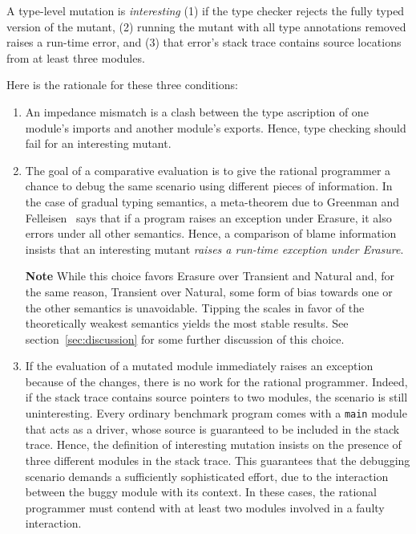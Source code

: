 
A type-level mutation is {\em interesting\/} (1) if the type checker rejects the fully typed version of the mutant,
(2) running the mutant with all type annotations removed raises a run-time error, and
(3) that error's stack trace contains source locations from at least three modules.

Here is the rationale for these three conditions:
\begin{enumerate}

\item An impedance mismatch is a clash between the type ascription of one
module's imports and another module's exports. Hence, type checking should fail
for an interesting mutant.

\item The goal of a comparative evaluation is to give the rational programmer a
chance to debug the same scenario using different pieces of information.  In the
case of gradual typing semantics, a meta-theorem due to Greenman and
Felleisen~\cite{gf-icfp-2018} says that if a program raises an exception under
Erasure, it also errors under all other semantics.  Hence, a comparison of blame
information insists that an interesting mutant {\em raises a run-time exception
under Erasure\/}.

{\bf Note} While this choice favors Erasure over Transient and Natural and, for
the same reason, Transient over Natural, some form of bias towards one or the
other semantics is unavoidable. Tipping the scales in favor of the theoretically
weakest semantics yields the most stable results. See
section~\ref{sec:discussion} for some further discussion of this choice.


\item If the evaluation of a mutated module immediately raises an exception because
of the changes, there is no work for the rational programmer. Indeed, if the
stack trace contains source pointers to two modules, the scenario is still
uninteresting. Every ordinary benchmark program comes with a {\tt main} module
that acts as a driver, whose source is guaranteed to be included in the stack
trace.  Hence, the definition of interesting mutation insists on the presence of
three different modules in the stack trace. This guarantees that the debugging
scenario demands a sufficiently sophisticated effort, due to the interaction
between the buggy module with its context.  In these cases, the rational
programmer must contend with at least two modules involved in a faulty
interaction.

\end{enumerate}

